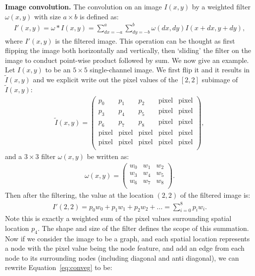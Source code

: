 \vspace{2mm}
\noindent \textbf{Image convolution.} The convolution on an image $I(x, y)$ by a weighted filter $\omega(x,y)$ with size $a \times b$ is defined as:
\begin{gather}
I'(x, y) = \omega \ast I(x, y) = \sum_{dx = -a}^{a}\sum_{dy=-b}^{b}\omega(dx, dy)I(x + dx, y + dy),
\end{gather}
where $I'(x, y)$ is the filtered image. This operation can be thought as first flipping the image both horizontally and vertically, then `sliding' the filter on the image to conduct point-wise product followed by sum. We now give an example. Let $I(x, y)$ to be an $5 \times 5$ single-channel image. We first flip it and it results in $\tilde I(x, y)$ and we explicit write out the pixel values of the $[2, 2]$ subimage of $\tilde I(x, y)$:
\begin{gather}
\tilde I(x, y) = \left(
\begin{array}{ccccc}
 p_0 & p_1 & p_2 & \text{pixel} & \text{pixel} \\
 p_3 & p_4 & p_5 & \text{pixel} & \text{pixel} \\
 p_6 & p_7 & p_8 & \text{pixel} & \text{pixel} \\
 \text{pixel} & \text{pixel} & \text{pixel} & \text{pixel} & \text{pixel} \\
 \text{pixel} & \text{pixel} & \text{pixel} & \text{pixel} & \text{pixel} \\
\end{array}
\right),
\end{gather}
and a $3 \times 3$ filter $\omega(x, y)$ be written as: 
\begin{gather}
\omega(x, y) = \left(
\begin{array}{ccc}
 w_0 & w_1 & w_2 \\
 w_3 & w_4 & w_5 \\
 w_6 & w_7 & w_8 \\
\end{array}
\right).
\end{gather}
Then after the filtering, the value at the location $(2, 2)$ of the filtered image is:
\begin{gather}
\label{eq:conveg}
I'(2, 2) = p_0 w_0 + p_1 w_1 + p_2 w_2 + ... = \sum_{i = 0}^8 p_i w_i.
\end{gather}
Note this is exactly a weighted sum of the pixel values surrounding spatial location $p_4$. The shape and size of the filter defines the scope of this summation. Now if we consider the image to be a graph, and each spatial location represents a node with the pixel value being the node feature, and add an edge from each node to its surrounding nodes (including diagonal and anti diagonal), we can rewrite Equation~\ref{eq:conveg} to be:
